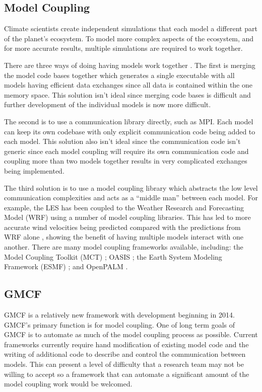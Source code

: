 \subsection{Model Coupling}

Climate scientists create independent simulations that each model a different
part of the planet's ecosystem. To model more complex aspects of the ecosystem,
and for more accurate results, multiple simulations are required to work
together.

There are three ways of doing having models work together \cite{Thevenin}. The
first is merging the model code bases together which generates a single
executable with all models having efficient data exchanges since all data is
contained within the one memory space. This solution isn't ideal since merging
code bases is difficult and further development of the individual models is now
more difficult.

The second is to use a communication library directly, such as MPI. Each model
can keep its own codebase with only explicit communication code being added to
each model. This solution also isn't ideal since the communication code isn't
generic since each model coupling will require its own communication code and
coupling more than two models together results in very complicated exchanges
being implemented.

The third solution is to use a model coupling library which abstracts the low
level communication complexities and acts as a ``middle man'' between each
model. For example, the LES has been coupled to the Weather Research and
Forecasting Model (WRF) using a number of model coupling libraries. This has led
to more accurate wind velocities being predicted compared with the predictions
from WRF alone \cite{Kinbara2010,Nakayama1998}, showing the benefit of having
multiple models interact with one another. There are many model coupling
frameworks available, including: the Model Coupling Toolkit (MCT)
\cite{Jacob2005,Larson2005}; OASIS \cite{Valcke2013,Valcke}; the Earth System
Modeling Framework (ESMF) \cite{Ramework2004}; and OpenPALM
\cite{Piacentini2011}.

\subsection{GMCF}

GMCF is a relatively new framework with development beginning in 2014. GMCF's
primary function is for model coupling. One of long term goals of GMCF is to
automate as much of the model coupling process as possible. Current frameworks
currently require hand modification of existing model code and the writing of
additional code to describe and control the communication between models. This
can present a level of difficulty that a research team may not be willing to
accept so a framework that can automate a significant amount of the model
coupling work would be welcomed.

